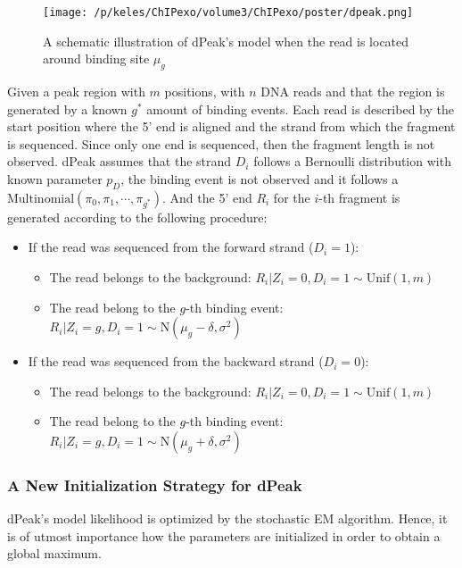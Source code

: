 \documentclass[11pt]{article}\usepackage[]{graphicx}\usepackage[]{color}
\begin{document}
\newpage

\begin{figure}[H]
  \centering
  \texttt{[image: /p/keles/ChIPexo/volume3/ChIPexo/poster/dpeak.png]}
  \caption{A schematic illustration of dPeak's model when the read is
    located around binding site $\mu_g$}
\end{figure}

Given a peak region with $m$ positions, with $n$ DNA reads and that
the region is generated by a known $g^*$ amount of binding
events. Each read is described by the start position where the 5' end
is aligned and the strand from which the fragment is sequenced. Since
only one end is sequenced, then the fragment length is not
observed. dPeak assumes that the strand $D_i$ follows a Bernoulli
distribution with known parameter $p_D$, the binding event is not
observed and it follows a
$\mbox{Multinomial}(\pi_0,\pi_1,\cdots,\pi_{g^*})$. And the 5' end
$R_i$ for the $i$-th fragment is generated according to the following
procedure:

\begin{itemize}
\item If the read was sequenced from the forward strand ($D_i = 1$):
  \begin{itemize}
  \item The read belongs to the background: $R_i | Z_i = 0, D_i = 1
    \sim \mbox{Unif}(1, m)$
  \item The read belong to the $g$-th binding event: $R_i | Z_i = g,
    D_i = 1 \sim \mbox{N}(\mu_g - \delta , \sigma^2)$
  \end{itemize}
\item If the read was sequenced from the backward strand ($D_i =
  0$):
  \begin{itemize}
  \item The read belongs to the background: $R_i | Z_i = 0, D_i = 1
    \sim \mbox{Unif}(1 , m)$
  \item The read belong to the $g$-th binding event: $R_i | Z_i = g,
    D_i = 1 \sim \mbox{N}(\mu_g + \delta , \sigma^2)$
  \end{itemize}
  
\end{itemize}

\subsubsection{A New Initialization Strategy for dPeak}
\label{sec:algo}

dPeak's model likelihood is optimized by the stochastic EM
algorithm. Hence, it is of utmost importance how the parameters are
initialized in order to obtain a global maximum.
\end{document}
